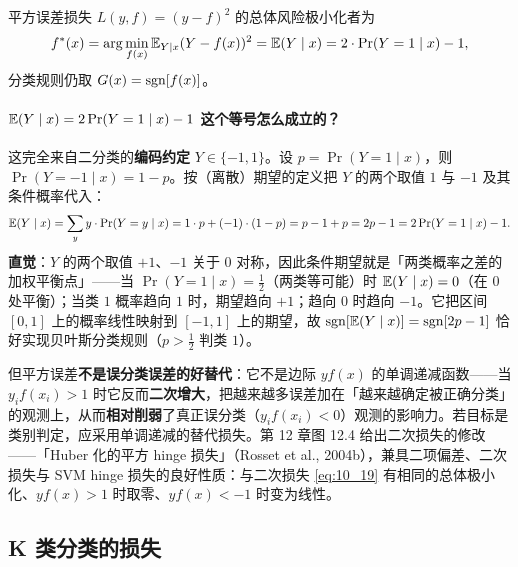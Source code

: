 平方误差损失 $L(y, f) = (y - f)^2$ 的总体风险极小化者为
\begin{equation}\label{eq:10_19}
    f^*(x) = \arg\min_{f(x)} \mathbb{E}_{Y \mid x}(Y - f(x))^2 = \mathbb{E}(Y \mid x) = 2\cdot \Pr(Y = 1 \mid x) - 1,
\end{equation}
分类规则仍取 $G(x) = \mathrm{sgn}[f(x)]$。

\paragraph{$\mathbb{E}(Y \mid x) = 2\Pr(Y = 1 \mid x) - 1$ 这个等号怎么成立的？}

这完全来自二分类的\textbf{编码约定} $Y \in \{-1, 1\}$。设 $p = \Pr(Y = 1 \mid x)$，则 $\Pr(Y = -1 \mid x) = 1 - p$。按（离散）期望的定义把 $Y$ 的两个取值 $1$ 与 $-1$ 及其条件概率代入：
\[
    \mathbb{E}(Y \mid x) = \sum_y y \cdot \Pr(Y = y \mid x)
    = 1 \cdot p + (-1) \cdot (1 - p)
    = p - 1 + p
    = 2p - 1
    = 2\Pr(Y = 1 \mid x) - 1.
\]
\textbf{直觉}：$Y$ 的两个取值 $+1$、$-1$ 关于 $0$ 对称，因此条件期望就是「两类概率之差的加权平衡点」——当 $\Pr(Y=1\mid x) = \frac{1}{2}$（两类等可能）时 $\mathbb{E}(Y\mid x) = 0$（在 $0$ 处平衡）；当类 $1$ 概率趋向 $1$ 时，期望趋向 $+1$；趋向 $0$ 时趋向 $-1$。它把区间 $[0,1]$ 上的概率线性映射到 $[-1,1]$ 上的期望，故 $\mathrm{sgn}[\mathbb{E}(Y\mid x)] = \mathrm{sgn}[2p-1]$ 恰好实现贝叶斯分类规则（$p > \frac{1}{2}$ 判类 $1$）。

但平方误差\textbf{不是误分类误差的好替代}：它不是边际 $yf(x)$ 的单调递减函数——当 $y_i f(x_i) > 1$ 时它反而\textbf{二次增大}，把越来越多误差加在「越来越确定被正确分类」的观测上，从而\textbf{相对削弱}了真正误分类（$y_i f(x_i) < 0$）观测的影响力。若目标是类别判定，应采用单调递减的替代损失。第 12 章图 12.4 给出二次损失的修改——「Huber 化的平方 hinge 损失」（Rosset et al., 2004b），兼具二项偏差、二次损失与 SVM hinge 损失的良好性质：与二次损失 \eqref{eq:10_19} 有相同的总体极小化、$yf(x) > 1$ 时取零、$yf(x) < -1$ 时变为线性。

\subsection{K 类分类的损失}

